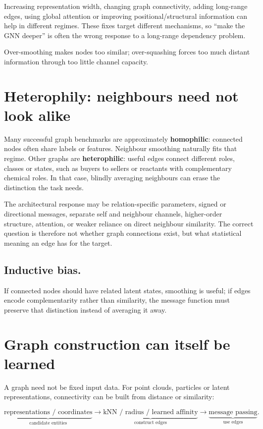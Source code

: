 Increasing representation width, changing graph connectivity, adding long-range edges, using global attention or improving positional/structural information can help in different regimes.
These fixes target different mechanisms, so ``make the GNN deeper'' is often the wrong response to a long-range dependency problem.

\begin{calloutintuition}
Over-smoothing makes nodes too similar; over-squashing forces too much distant information through too little channel capacity.
\end{calloutintuition}

\section{Heterophily: neighbours need not look alike}
Many successful graph benchmarks are approximately \textbf{homophilic}: connected nodes often share labels or features.
Neighbour smoothing naturally fits that regime.
Other graphs are \textbf{heterophilic}: useful edges connect different roles, classes or states, such as buyers to sellers or reactants with complementary chemical roles.
In that case, blindly averaging neighbours can erase the distinction the task needs.

The architectural response may be relation-specific parameters, signed or directional messages, separate self and neighbour channels, higher-order structure, attention, or weaker reliance on direct neighbour similarity.
The correct question is therefore not whether graph connections exist, but what statistical meaning an edge has for the target.

\subsection{Inductive bias.}
If connected nodes should have related latent states, smoothing is useful; if edges encode complementarity rather than similarity, the message function must preserve that distinction instead of averaging it away.

\section{Graph construction can itself be learned}
A graph need not be fixed input data.
For point clouds, particles or latent representations, connectivity can be built from distance or similarity:

\[
\underbrace{\text{representations / coordinates}}_{\text{candidate entities}}
\rightarrow
\underbrace{\text{kNN / radius / learned affinity}}_{\text{construct edges}}
\rightarrow
\underbrace{\text{message passing}}_{\text{use edges}}.
\]

